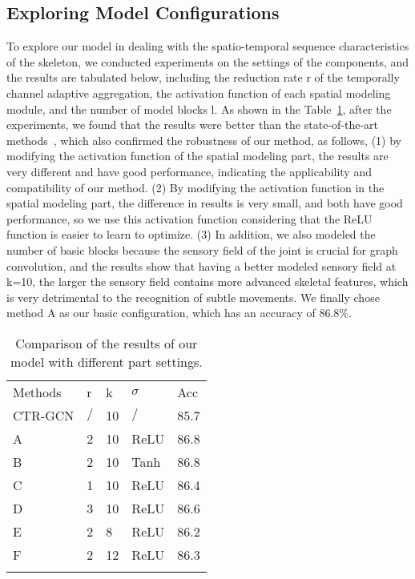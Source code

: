 \documentclass[letterpaper]{article} \usepackage[submission]{aaai23}  \usepackage{times}  \usepackage{helvet}  \usepackage{courier}  \usepackage[hyphens]{url}  \usepackage{graphicx} \urlstyle{rm} \def\UrlFont{\rm}  \usepackage{natbib}  \usepackage{caption} \frenchspacing  \setlength{\pdfpagewidth}{8.5in} \setlength{\pdfpageheight}{11in} \usepackage{algorithm}
\begin{document}
\subsection{Exploring Model Configurations}
To explore our model in dealing with the spatio-temporal sequence characteristics of the skeleton, we conducted experiments on the settings of the components, and the results are tabulated below, including the reduction rate r of the temporally channel adaptive aggregation, the activation function of each spatial modeling module, and the number of model blocks l. As shown in the Table~\ref{133}, after the experiments, we found that the results were better than the state-of-the-art methods~\cite{2021Channel}, which also confirmed the robustness of our method, as follows, (1) by modifying the activation function of the spatial modeling part, the results are very different and have good performance, indicating the applicability and compatibility of our method. (2) By modifying the activation function in the spatial modeling part, the difference in results is very small, and both have good performance, so we use this activation function considering that the ReLU function is easier to learn to optimize. (3) In addition, we also modeled the number of basic blocks because the sensory field of the joint is crucial for graph convolution, and the results show that having a better modeled sensory field at k=10, the larger the sensory field contains more advanced skeletal features, which is very detrimental to the recognition of subtle movements. We finally chose method A as our basic configuration, which has an accuracy of 86.8$\%$.




\begin{table}[htp]
 \centering
\begin{tabular}{lllll}
\hline\noalign{\smallskip}
Methods & r &k & $\sigma $ & Acc\\
\noalign{\smallskip}\hline\noalign{\smallskip}
CTR-GCN&$/$&10&$/$&85.7\\
A& 2&10&ReLU&86.8\\
B& 2&10&Tanh&86.8\\
C& 1&10&ReLU&86.4\\
D& 3&10&ReLU&86.6\\
E& 2&8&ReLU&86.2\\
F& 2&12&ReLU&86.3\\
\noalign{\smallskip}\hline
\end{tabular}
\caption{Comparison of the results of our model with different part settings.}
\label{133}
\end{table}
\end{document}
